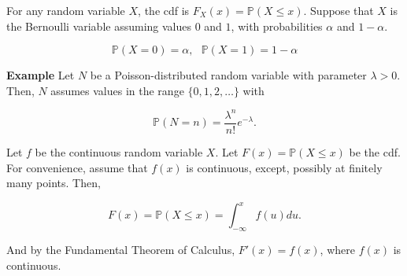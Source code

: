 \documentclass[12pt]{article}
\newcommand{\prob}[1]{\mathbb{P}(#1)}
\begin{document}
\noindent
For any random variable $X$, the cdf is $F_X (x) =  \prob{X \leq x}$. Suppose that $X$ is the Bernoulli variable assuming values $0$ and $1$, with probabilities $\alpha$ and $1-\alpha$.

\begin{equation*}
\prob{X = 0} = \alpha , \text{ } \prob{X = 1} = 1 - \alpha
\end{equation*}

\begin{tcolorbox}
\textbf{Example} Let $N$ be a Poisson-distributed random variable with parameter $\lambda > 0$. Then, $N$ assumes values in the range $\{ 0, 1, 2, \ldots \}$ with

\begin{equation*}
\prob{N = n} = \frac{\lambda^n}{n!} e^{- \lambda}.
\end{equation*}


\begin{center}
\end{center}

\end{tcolorbox}

\noindent
Let $f$ be the continuous random variable $X$. Let $F(x) = \prob{X \leq x}$ be the cdf. For convenience, assume that $f(x)$ is continuous, except, possibly at finitely many points. Then, 

\begin{equation*}
F(x) = \prob{X \leq x} = \int_{- \infty}^{x} f(u) du.
\end{equation*}

\noindent
And by the Fundamental Theorem of Calculus, $F'(x) = f(x)$, where $f(x)$ is continuous. 
\end{document}
